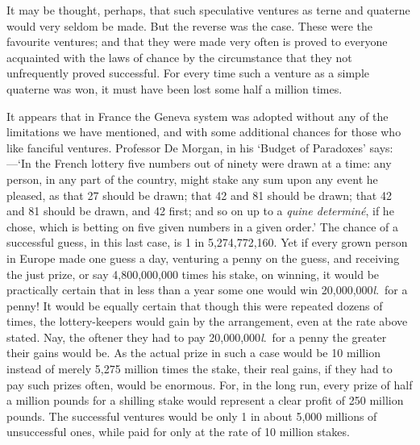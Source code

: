 \documentclass[letterpaper,12pt,oneside,openany]{memoir}
\begin{document}
It may be thought, perhaps, that such speculative
ventures as terne and quaterne would very seldom be
made. But the reverse was the case. These were the
favourite ventures; and that they were made very often
is proved to everyone acquainted with the laws of
chance by the circumstance that they not unfrequently
proved successful. For every time such a venture as a
simple quaterne was won, it must have been lost some
half a million times.

It appears that in France the Geneva system was
adopted without any of the limitations we have mentioned,
and with some additional chances for those who
like fanciful ventures. Professor De Morgan, in his
`Budget of Paradoxes' says:---`In the French lottery five
numbers out of ninety were drawn at a time: any
person, in any part of the country, might stake any sum
upon any event he pleased, as that 27 should be drawn;
that 42 and 81 should be drawn; that 42 and 81
should be drawn, and 42 first; and so on up to a \textit{quine
determin\'e}, if he chose, which is betting on five given
numbers in a given order.' The chance of a successful
guess, in this last case, is 1 in 5,274,772,160. Yet if
every grown person in Europe made one guess a day,
venturing a penny on the guess, and receiving the just
prize, or say 4,800,000,000 times his stake, on winning,
it would be practically certain that in less than a year
some one would win 20,000,000\textit{l}.\ for a penny! It
would be equally certain that though this were repeated
dozens of times, the lottery-keepers would gain by the
arrangement, even at the rate above stated. Nay, the
oftener they had to pay 20,000,000\textit{l}.\ for a penny the
greater their gains would be. As the actual prize
in such a case would be 10 million instead of merely
5,275 million times the stake, their real gains, if they
had to pay such prizes often, would be enormous. For,
in the long run, every prize of half a million pounds for
a shilling stake would represent a clear profit of 250
million pounds. The successful ventures would be only
1 in about 5,000 millions of unsuccessful ones, while
paid for only at the rate of 10 million stakes.
\end{document}
